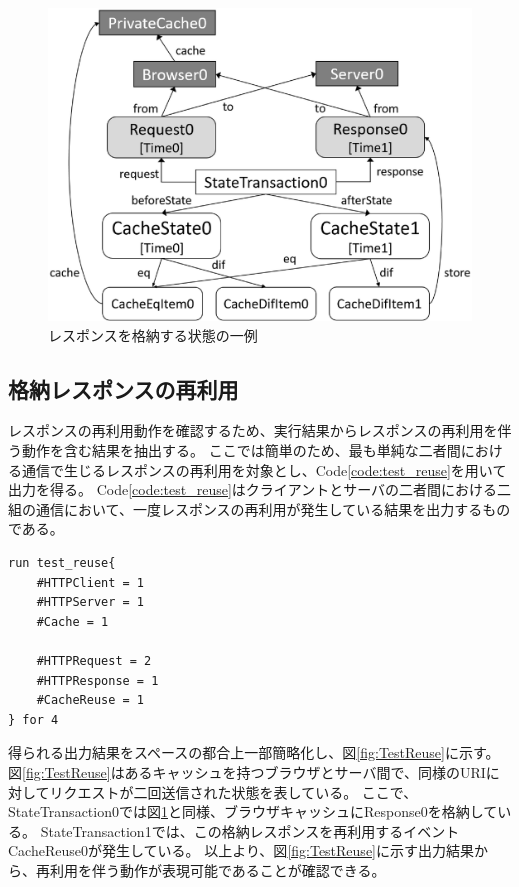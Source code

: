 \documentclass[12pt,a4paper]{jbook}
\begin{document}
\begin{figure}[htb]
\centering
\includegraphics[width=450pt]{./fig/TestStore.eps}
\caption{レスポンスを格納する状態の一例}
\label{fig:TestStore}
\end{figure}

\subsection{格納レスポンスの再利用}
レスポンスの再利用動作を確認するため、実行結果からレスポンスの再利用を伴う動作を含む結果を抽出する。
ここでは簡単のため、最も単純な二者間における通信で生じるレスポンスの再利用を対象とし、Code\ref{code:test_reuse}を用いて出力を得る。
Code\ref{code:test_reuse}はクライアントとサーバの二者間における二組の通信において、一度レスポンスの再利用が発生している結果を出力するものである。

\begin{lstlisting}[caption=格納レスポンスの再利用, label=code:test_reuse]
run test_reuse{
	#HTTPClient = 1
	#HTTPServer = 1
	#Cache = 1

	#HTTPRequest = 2
	#HTTPResponse = 1
	#CacheReuse = 1
} for 4
\end{lstlisting}

得られる出力結果をスペースの都合上一部簡略化し、図\ref{fig:TestReuse}に示す。
図\ref{fig:TestReuse}はあるキャッシュを持つブラウザとサーバ間で、同様のURIに対してリクエストが二回送信された状態を表している。
ここで、StateTransaction0では図\ref{fig:TestStore}と同様、ブラウザキャッシュにResponse0を格納している。
StateTransaction1では、この格納レスポンスを再利用するイベントCacheReuse0が発生している。
以上より、図\ref{fig:TestReuse}に示す出力結果から、再利用を伴う動作が表現可能であることが確認できる。
\end{document}
